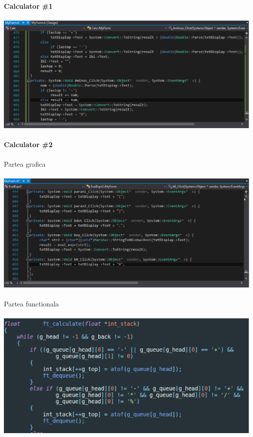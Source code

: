 \textbf{Calculator \#1}\\
\\
\includegraphics[width=\textwidth]{1.eps}\\
\\
\textbf{Calculator \#2}\\
\\
Partea grafica\\
\\
\includegraphics[width=\textwidth]{2.eps}\\
\\
Partea functionala\\
\\
\includegraphics[width=\textwidth]{3.eps}\\
\clearpage
